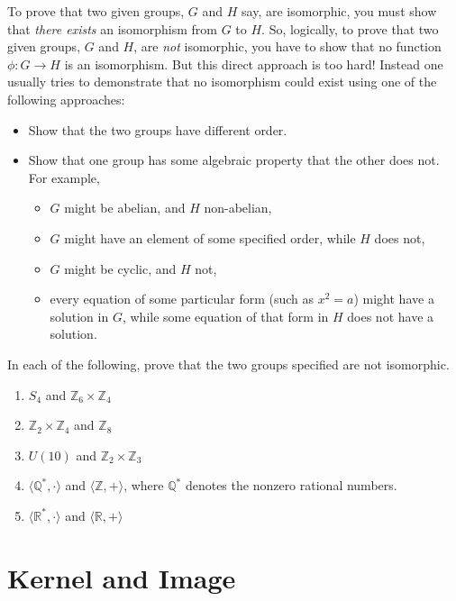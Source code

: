 To prove that two given groups, \(G\) and \(H\) say, are isomorphic, you must show that \emph{there exists} an isomorphism from \(G\) to \(H\).  So, logically, to prove that two given groups, \(G\) and \(H\), are \emph{not} isomorphic, you have to show that no function \(\phi: G \longrightarrow H \) is an isomorphism. But this direct approach is too hard! Instead one usually tries to demonstrate that no isomorphism could exist using one of the following approaches:
\begin{itemize}
  \item Show that the two groups have different order.
  \item Show that one group has some algebraic property that the other does not. For example,
  \begin{itemize}
    \item \(G\) might be abelian, and \(H\) non-abelian,
    \item \(G\) might have an element of some specified order, while \(H\) does not,
    \item \(G\) might be cyclic, and \(H\) not,
    \item every equation of some particular form (such as \(x^2 = a\)) might have a solution in \(G\), while some equation of that form in \(H\) does not have a solution.
  \end{itemize}
\end{itemize}

\begin{problem}
In each of the following, prove that the two groups specified are
not isomorphic.
      \begin{enumerate}
  \item \( S_4 \) and \(\mathbb{Z}_6 \times \mathbb{Z}_4\)
  \item \(\mathbb{Z}_2 \times \mathbb{Z}_4\) and \( \mathbb{Z}_8 \)
  \item \(U(10)\) and \(\mathbb{Z}_2 \times \mathbb{Z}_3\)
  \item \(\langle \mathbb{Q}^*, \cdot \rangle \) and \( \langle \mathbb{Z}, + \rangle \), where \(\mathbb{Q}^*\) denotes the nonzero rational numbers.
  \item \(\langle \mathbb{R}^*, \cdot \rangle \) and \( \langle \mathbb{R}, + \rangle \)
\end{enumerate}
\end{problem}

\section{Kernel and Image}

